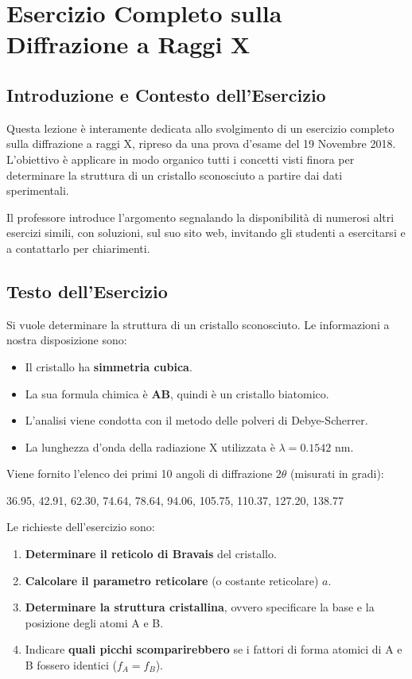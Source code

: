 \section{Esercizio Completo sulla Diffrazione a Raggi X}
\label{sec:lecture7}

\subsection{Introduzione e Contesto dell'Esercizio}

Questa lezione è interamente dedicata allo svolgimento di un esercizio completo sulla diffrazione a raggi X, ripreso da una prova d'esame del 19 Novembre 2018. L'obiettivo è applicare in modo organico tutti i concetti visti finora per determinare la struttura di un cristallo sconosciuto a partire dai dati sperimentali.

Il professore introduce l'argomento segnalando la disponibilità di numerosi altri esercizi simili, con soluzioni, sul suo sito web, invitando gli studenti a esercitarsi e a contattarlo per chiarimenti.

\subsection{Testo dell'Esercizio}

Si vuole determinare la struttura di un cristallo sconosciuto. Le informazioni a nostra disposizione sono:
\begin{itemize}
    \item Il cristallo ha \textbf{simmetria cubica}.
    \item La sua formula chimica è \textbf{AB}, quindi è un cristallo biatomico.
    \item L'analisi viene condotta con il metodo delle polveri di Debye-Scherrer.
    \item La lunghezza d'onda della radiazione X utilizzata è $\lambda = 0.1542$ nm.
\end{itemize}

Viene fornito l'elenco dei primi 10 angoli di diffrazione $2\theta$ (misurati in gradi):
\begin{center}
36.95, 42.91, 62.30, 74.64, 78.64, 94.06, 105.75, 110.37, 127.20, 138.77
\end{center}

Le richieste dell'esercizio sono:
\begin{enumerate}
    \item \textbf{Determinare il reticolo di Bravais} del cristallo.
    \item \textbf{Calcolare il parametro reticolare} (o costante reticolare) $a$.
    \item \textbf{Determinare la struttura cristallina}, ovvero specificare la base e la posizione degli atomi A e B.
    \item Indicare \textbf{quali picchi scomparirebbero} se i fattori di forma atomici di A e B fossero identici ($f_A = f_B$).
\end{enumerate}

